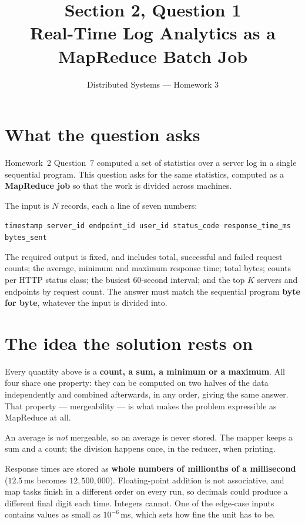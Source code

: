 \documentclass[11pt,a4paper]{article}
\title{\textbf{Section 2, Question 1}\\[0.3em]
       \large Real-Time Log Analytics as a MapReduce Batch Job}
\author{Distributed Systems --- Homework 3}
\date{}
\begin{document}
\maketitle
\vspace{-2.5em}

\section{What the question asks}

Homework~2 Question~7 computed a set of statistics over a server log in a single
sequential program. This question asks for the same statistics, computed as a
\textbf{MapReduce job} so that the work is divided across machines.

The input is $N$ records, each a line of seven numbers:

\begin{center}\small
\texttt{timestamp \quad server\_id \quad endpoint\_id \quad user\_id \quad
status\_code \quad response\_time\_ms \quad bytes\_sent}
\end{center}

The required output is fixed, and includes total, successful and failed request
counts; the average, minimum and maximum response time; total bytes; counts per
HTTP status class; the busiest 60-second interval; and the top $K$ servers and
endpoints by request count. The answer must match the sequential program
\textbf{byte for byte}, whatever the input is divided into.

\section{The idea the solution rests on}

Every quantity above is a \textbf{count, a sum, a minimum or a maximum}. All
four share one property: they can be computed on two halves of the data
independently and combined afterwards, in any order, giving the same answer.
That property --- mergeability --- is what makes the problem expressible as
MapReduce at all.

An average is \emph{not} mergeable, so an average is never stored. The mapper
keeps a sum and a count; the division happens once, in the reducer, when
printing.

Response times are stored as \textbf{whole numbers of millionths of a
millisecond} ($12.5$\,ms becomes $12{,}500{,}000$). Floating-point addition is
not associative, and map tasks finish in a different order on every run, so
decimals could produce a different final digit each time. Integers cannot. One
of the edge-case inputs contains values as small as $10^{-6}$\,ms, which sets
how fine the unit has to be.
\end{document}
